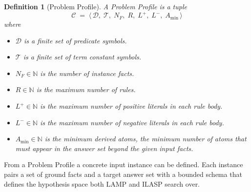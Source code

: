 \documentclass[11pt,a4paper]{article}
\newtheorem{definition}{Definition}
\begin{document}
\begin{definition}[Problem Profile]
\label{def:profile}
A \emph{Problem Profile} is a tuple
\[
  \mathcal{C} \;=\; \langle\, \mathcal{D},\; \mathcal{T},\; N_F,\; R,\; L^+,\; L^-,\; A_{\min} \,\rangle
\]
where
\begin{itemize}
  \item $\mathcal{D}$ is a finite set of predicate symbols.
  \item $\mathcal{T}$ is a finite set of term constant symbols.
  \item $N_F \in \mathbb{N}$ is the number of \emph{instance facts}.
  \item $R \in \mathbb{N}$ is the maximum number of \emph{rules}.
  \item $L^+ \in \mathbb{N}$ is the maximum number of \emph{positive literals} in each rule body.
  \item $L^- \in \mathbb{N}$ is the maximum number of \emph{negative literals} in each rule body.
  \item $A_{\min} \in \mathbb{N}$ is the \emph{minimum derived atoms}, the minimum number of atoms that must appear in the answer set beyond the given input facts.
\end{itemize}
\end{definition}

From a Problem Profile a concrete input instance can be defined. Each instance pairs a set of ground facts and a target answer set with a bounded schema that defines the hypothesis space both LAMP and ILASP search over.
\end{document}
